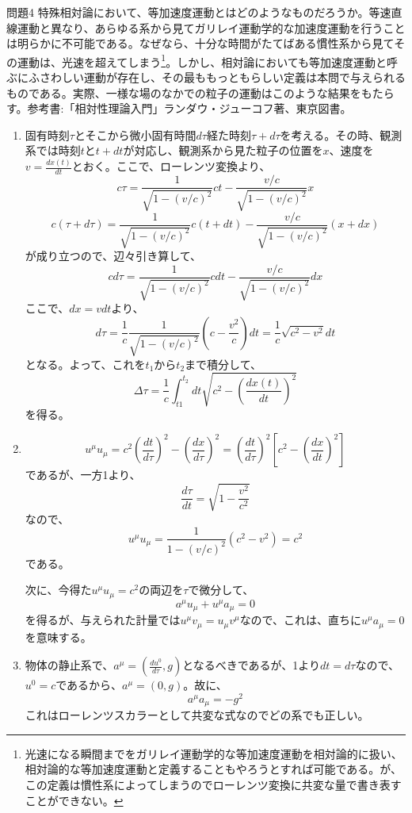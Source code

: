 \documentclass[fleqn]{jbook}
\begin{document}
\begin{answer}{問題4}{}
特殊相対論において、等加速度運動とはどのようなものだろうか。等速直線運動と異なり、あらゆる系から見てガリレイ運動学的な加速度運動を行うことは明らかに不可能である。なぜなら、十分な時間がたてばある慣性系から見てその運動は、光速を超えてしまう\footnote{光速になる瞬間までをガリレイ運動学的な等加速度運動を相対論的に扱い、相対論的な等加速度運動と定義することもやろうとすれば可能である。が、この定義は慣性系によってしまうのでローレンツ変換に共変な量で書き表すことができない。}。しかし、相対論においても等加速度運動と呼ぶにふさわしい運動が存在し、その最ももっともらしい定義は本問で与えられるものである。実際、一様な場のなかでの粒子の運動はこのような結果をもたらす。参考書:「相対性理論入門」ランダウ・ジューコフ著、東京図書。
\begin{enumerate}
	\item 固有時刻$\tau$とそこから微小固有時間$d\tau$経た時刻$\tau+d\tau$を考える。その時、観測系では時刻$t$と$t+dt$が対応し、観測系から見た粒子の位置を$x$、速度を$v = \frac{dx(t)}{dt} $とおく。ここで、ローレンツ変換より、
	$$ c\tau = \frac{1}{\sqrt{1-(v/c)^2}}ct - \frac{v/c}{\sqrt{1-(v/c)^2}}x $$
	$$ c(\tau+d\tau) = \frac{1}{\sqrt{1-(v/c)^2}}c(t+dt) - \frac{v/c}{\sqrt{1-(v/c)^2}}(x+dx) $$
	が成り立つので、辺々引き算して、
	$$ cd\tau = \frac{1}{\sqrt{1-(v/c)^2}}cdt - \frac{v/c}{\sqrt{1-(v/c)^2}}dx $$
	ここで、$dx = vdt$より、
	$$ d\tau = \frac{1}{c}\frac{1}{\sqrt{1-(v/c)^2}}\left(c-\frac{v^2}{c}\right)dt = \frac{1}{c}\sqrt{c^2-v^2}dt $$
となる。よって、これを$t_1$から$t_2$まで積分して、
$$  \Delta\tau = \frac{1}{c}\int_{t1}^{t_2} dt \sqrt{c^2-\left(\frac{dx(t)}{dt}\right)^2} $$
を得る。
\item 
$$ u^{\mu}u_{\mu} = c^2\left(\frac{dt}{d\tau}\right)^2-\left(\frac{dx}{d\tau}\right)^2 = \left(\frac{dt}{d\tau}\right)^2\left[c^2-\left(\frac{dx}{dt}\right)^2 \right] $$ 
であるが、一方1より、
$$ \frac{d\tau}{dt} = \sqrt{1-\frac{v^2}{c^2}} $$
なので、
$$ u^{\mu}u_{\mu}  = \frac{1}{1-(v/c)^2}(c^2-v^2) = c^2 $$
である。

次に、今得た$ u^{\mu}u_{\mu} = c^2 $の両辺を$\tau$で微分して、
$$ a^{\mu}u_{\mu} +u^{\mu}a_{\mu}= 0 $$
を得るが、与えられた計量では$u^{\mu}v_{\mu} = u_{\mu}v^{\mu}$なので、これは、直ちに$u^{\mu}a_{\mu}= 0$を意味する。

\item 物体の静止系で、$a^{\mu} = ( \frac{du^0}{d\tau},g ) $となるべきであるが、1より$dt = d\tau $なので、$u^0 = c $であるから、$a^{\mu} = (0,g) $。故に、
$$ a^{\mu}a_{\mu} = -g^2 $$
これはローレンツスカラーとして共変な式なのでどの系でも正しい。


\end{enumerate}
\end{answer}
\end{document}
